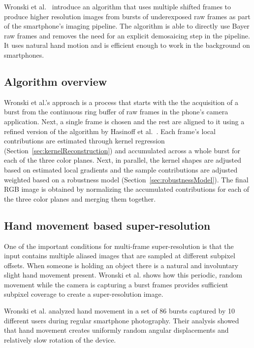 \documentclass{sig-alternate}
\begin{document}
Wronski et al.~\cite{Wronski2019} introduce an algorithm that uses multiple shifted frames to produce higher resolution images from bursts of underexposed raw frames as part of the smartphone's imaging pipeline. The algorithm is able to directly use Bayer raw frames and removes the need for an explicit demosaicing step in the pipeline. It uses natural hand motion and is efficient enough to work in the background on smartphones.

\subsection{Algorithm overview}

Wronski et al.'s approach is a process that starts with the the acquisition of a burst from the continuous ring buffer of raw frames in the phone's camera application. Next, a single frame is chosen and the rest are aligned to it using a refined version of the algorithm by Hasinoff et al.~\cite{Hasinoff2016}.
Each frame's local contributions are estimated through kernel regression (Section~\ref{sec:kernelReconstruction}) and accumulated across a whole burst for each of the three color planes.
Next, in parallel, the kernel shapes are adjusted based on estimated local gradients and the sample contributions are adjusted weighted based on a robustness model (Section~\ref{sec:robustnessModel}).
The final RGB image is obtained by normalizing the accumulated contributions for each of the three color planes and merging them together.

\subsection{Hand movement based super-resolution}


One of the important conditions for multi-frame super-resolution is that the input contains multiple aliased images that are sampled at different subpixel offsets. When someone is holding an object there is a natural and involuntary slight hand movement present. Wronski et al. shows how this periodic, random movement while the camera is capturing a burst frames provides sufficient subpixel coverage to create a super-resolution image.

Wronski et al. analyzed hand movement in a set of 86 bursts captured by 10 different users during regular smartphone photography.
Their analysis showed that hand movement creates uniformly random angular displacements and relatively slow rotation of the device.
\end{document}
